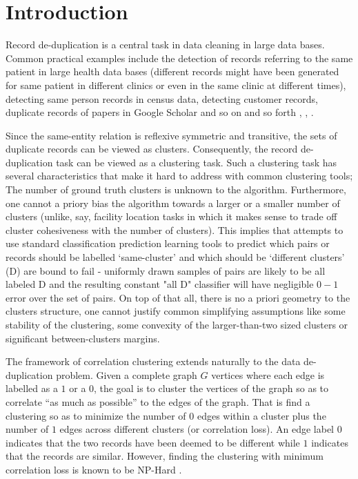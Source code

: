 \documentclass[12pt]{article}
\begin{document}
\fi

\section{Introduction}
Record de-duplication is a central task in data cleaning in large data bases. Common practical examples include the detection of records referring to the same patient in large health data bases (different records might have been generated for same patient in different clinics or even in the same clinic at different times), detecting same person records in census data, detecting customer records, duplicate records of papers in Google Scholar and so on and so forth \cite{elmagarmid2007duplicate}, \cite{chu2016distributed}, \cite{ilyas2015trends}.

Since the same-entity relation is reflexive symmetric and transitive, the sets of duplicate records can be viewed as clusters. Consequently, the record de-duplication task can be viewed as a clustering task. Such a clustering task has several characteristics that make it hard to address with common clustering tools; The number of ground truth clusters is unknown to the algorithm. Furthermore, one cannot a priory bias the algorithm towards a larger or a smaller number of clusters (unlike, say, facility location tasks in which it makes sense to trade off cluster cohesiveness with the number of clusters). This implies that attempts to use standard classification prediction learning tools to predict which pairs or records should be labelled `same-cluster' and which should be `different clusters' (D) are bound to fail - uniformly drawn samples of pairs are likely to be all labeled D and the resulting constant "all D" classifier will have negligible $0-1$ error over the set of pairs. On top of that all, there is no a priori geometry to the clusters structure, one cannot justify common simplifying assumptions like some stability of the clustering, some convexity of the larger-than-two sized clusters  or significant between-clusters margins.

The framework of correlation clustering extends naturally to the data de-duplication problem. Given a complete graph $G$ vertices where each edge is labelled as a $1$ or a $0$, the goal is to cluster the vertices of the graph so as to correlate “as much as possible” to the edges of the graph. That is find a clustering so as to minimize the number of $0$ edges within a cluster plus the number of $1$ edges across different clusters (or correlation loss). An edge label $0$ indicates that the two records have been deemed to be different while $1$ indicates that the records are similar. However, finding the clustering with minimum correlation loss is known to be NP-Hard \cite{bansal2004correlation}. 
\end{document}
